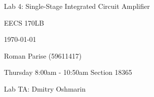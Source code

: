 \centering
\vspace{2.5cm}
{\huge Lab 4: Single-Stage Integrated Circuit Amplifier \par}
{\Large EECS 170LB \par}
{\Large \today \par}
{\Large Roman Parise (59611417) \par}
{\large \par}
{\large Thursday 8:00am - 10:50am Section 18365 \par}
{\large Lab TA: Dmitry Oshmarin \par}
\vspace{1cm}
\vspace{1cm}
